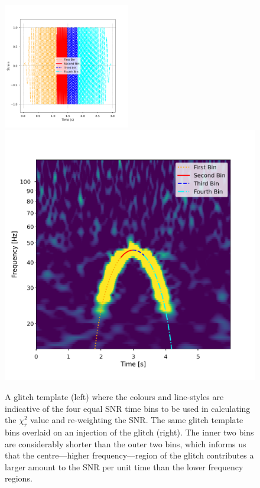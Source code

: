 \begin{figure}
  \centering
  \begin{minipage}[t]{1.0\linewidth}
  \includegraphics[width=0.49\textwidth]{images/4_archenemy/Section3/3.4/split_bins.pdf}
  \hspace{0.01\linewidth}
  \includegraphics[width=0.49\linewidth]{images/4_archenemy/Section3/3.4/split_bins_qscan.pdf}
  \end{minipage}
  \caption{A \scladj glitch template (left) where the colours and line-styles are indicative of the four equal SNR time bins to be used in calculating the $\chi_{r}^{2}$ value and re-weighting the SNR. The same \scladj glitch template bins overlaid on an injection of the \scladj glitch (right). The inner two bins are considerably shorter than the outer two bins, which informs us that the centre---higher frequency---region of the \scladj glitch contributes a larger amount to the SNR per unit time than the lower frequency regions.}
  \label{4:fig:split_temp_subplot}
\end{figure}

